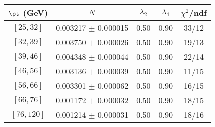 \begin{tabular}{c||c|c|c|c}
$\pt$ (GeV) & $N$ & $\lambda_{2}$ & $\lambda_4$  & $\chi^2$/ndf  \\
\hline
$[25, 32]$ & 0.003217 $\pm$ 0.000015 & 0.50 & 0.90 & 33/12\\
$[32, 39]$ & 0.003750 $\pm$ 0.000026 & 0.50 & 0.90 & 19/13\\
$[39, 46]$ & 0.004348 $\pm$ 0.000044 & 0.50 & 0.90 & 22/14\\
$[46, 56]$ & 0.003136 $\pm$ 0.000039 & 0.50 & 0.90 & 11/15\\
$[56, 66]$ & 0.003301 $\pm$ 0.000062 & 0.50 & 0.90 & 16/15\\
$[66, 76]$ & 0.001172 $\pm$ 0.000032 & 0.50 & 0.90 & 18/15\\
$[76, 120]$ & 0.001214 $\pm$ 0.000031 & 0.50 & 0.90 & 18/16\\
\end{tabular}
